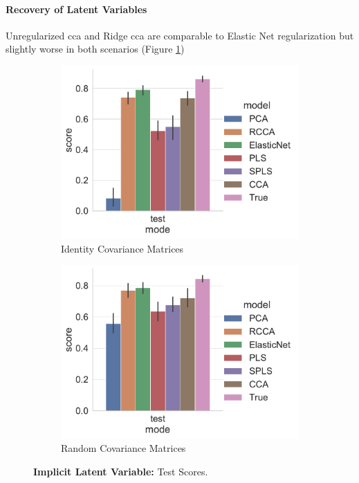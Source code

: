 \paragraph{Recovery of Latent Variables}

Unregularized \acrshort{cca} and Ridge \acrshort{cca} are comparable to Elastic Net regularization but slightly worse in both scenarios (Figure \ref{fig:implicit-latent-variable-scores})

\begin{figure}
    \centering
    \begin{subfigure}{0.49\linewidth}
        \centering
        \includegraphics[width=\linewidth]{figures/simulated/low/Train_Test_Scores_Identity_Covariance_implicit}
        \caption{Identity Covariance Matrices}
    \end{subfigure}
    \begin{subfigure}{0.49\linewidth}
        \centering
        \includegraphics[width=\linewidth]{figures/simulated/low/Train_Test_Scores_Random_Covariance_implicit}
        \caption{Random Covariance Matrices}
    \end{subfigure}
    \caption{\textbf{Implicit Latent Variable:} Test Scores.}\label{fig:implicit-latent-variable-scores}
\end{figure}


